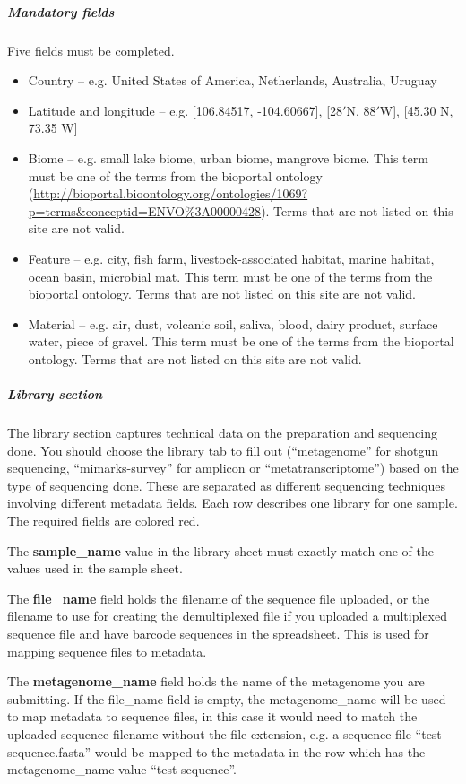 \documentclass[12pt,fullpage]{report}
\begin{document}
\subparagraph*{Mandatory fields}
Five fields must be completed.
\begin{itemize}
\item Country --
e.g. United States of America, Netherlands, Australia, Uruguay
\item Latitude and longitude --
e.g. [106.84517, -104.60667], [28$'$N, 88$'$W], [45.30 N, 73.35 W]
\item Biome --
e.g. small lake biome, urban biome, mangrove biome. This term must be one of the terms from the bioportal ontology (\url{http://bioportal.bioontology.org/ontologies/1069?p=terms&conceptid=ENVO\%3A00000428}). Terms that are not listed on this site are not valid.
\item Feature --
e.g. city, fish farm, livestock-associated habitat, marine habitat, ocean basin, microbial mat. This term must be one of the terms from the bioportal ontology. Terms that are not listed on this site are not valid.
\item Material --
e.g. air, dust, volcanic soil, saliva, blood, dairy product, surface water, piece of gravel. This term must be one of the terms from the bioportal ontology. Terms that are not listed on this site are not valid.
\end{itemize}

\subparagraph*{Library section}
The library section captures technical data on the preparation and sequencing done. You should choose the library tab to fill out (``metagenome'' for shotgun sequencing, ``mimarks-survey'' for amplicon or ``metatranscriptome'') based on the type of sequencing done. These are separated as different sequencing techniques involving different metadata fields. Each row describes one library for one sample. The required fields are colored red.

The \textbf{sample\_name} value in the library sheet must exactly match one of the values used in the sample sheet.

The \textbf{file\_name} field holds the filename of the sequence file uploaded, or the filename to use for creating the demultiplexed file if you uploaded a multiplexed sequence file and have barcode sequences in the spreadsheet. This is used for mapping sequence files to metadata.

The \textbf{metagenome\_name} field holds the name of the metagenome you are submitting. If the file\_name field is empty, the metagenome\_name will be used to map metadata to sequence files, in this case it would need to match the uploaded sequence filename without the file extension, e.g. a sequence file ``test-sequence.fasta'' would be mapped to the metadata in the row which has the metagenome\_name value ``test-sequence''.
\end{document}
